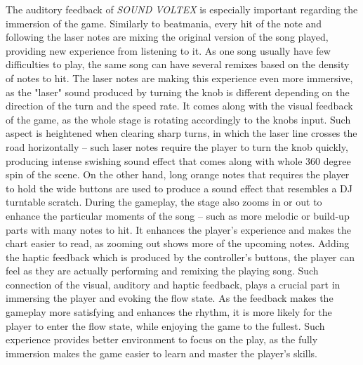 The auditory feedback of \textit{SOUND VOLTEX} is especially important regarding the immersion of the game. Similarly to beatmania, every hit of the note and following the laser notes are mixing the original version of the song played, providing new experience from listening to it. As one song usually have few difficulties to play, the same song can have several remixes based on the density of notes to hit. The laser notes are making this experience even more immersive, as the "laser" sound produced by turning the knob is different depending on the direction of the turn and the speed rate. It comes along with the visual feedback of the game, as the whole stage is rotating accordingly to the knobs input. Such aspect is heightened when clearing sharp turns, in which the laser line crosses the road horizontally -- such laser notes require the player to turn the knob quickly, producing intense swishing sound effect that comes along with whole 360 degree spin of the scene. On the other hand, long orange notes that requires the player to hold the wide buttons are used to produce a sound effect that resembles a DJ turntable scratch. During the gameplay, the stage also zooms in or out to enhance the particular moments of the song -- such as more melodic or build-up parts with many notes to hit. It enhances the player's experience and makes the chart easier to read, as zooming out shows more of the upcoming notes. Adding the haptic feedback which is produced by the controller's buttons, the player can feel as they are actually performing and remixing the playing song.
Such connection of the visual, auditory and haptic feedback, plays a crucial part in immersing the player and evoking the flow state. As the feedback makes the gameplay more satisfying and enhances the rhythm, it is more likely for the player to enter the flow state, while enjoying the game to the fullest. Such experience provides better environment to focus on the play, as the fully immersion makes the game easier to learn and master the player's skills. 

